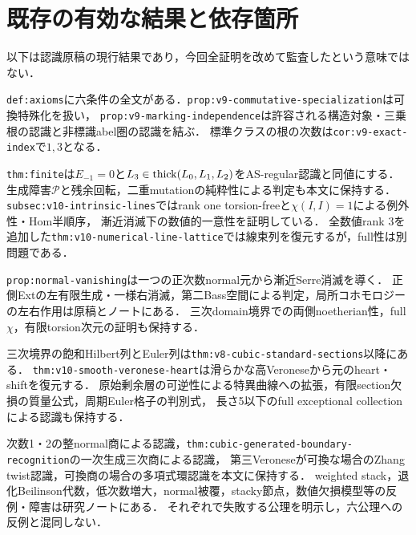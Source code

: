 \documentclass[11pt,a4paper]{ltjsarticle}
\begin{document}
\section{既存の有効な結果と依存箇所}
以下は認識原稿の現行結果であり，今回全証明を改めて監査したという意味ではない．
\begin{description}[style=nextline]
\item[六公理と標準クラス]
\texttt{def:axioms}に六条件の全文がある．\texttt{prop:v9-commutative-specialization}は可換特殊化を扱い，
\texttt{prop:v9-marking-independence}は許容される構造対象・三乗根の認識と非標識abel圏の認識を結ぶ．
標準クラスの根の次数は\texttt{cor:v9-exact-index}で$1,3$となる．
\item[有限障害と線束復元]
\texttt{thm:finite}は$E_{-1}=0$と$L_3\in\operatorname{thick}(L_0,L_1,L_2)$をAS-regular認識と同値にする．
生成障害$\mathcal P$と残余回転，二重mutationの純粋性による判定も本文に保持する．
\texttt{subsec:v10-intrinsic-lines}ではrank one torsion-freeと$\chi(I,I)=1$による例外性・Hom半順序，
漸近消滅下の数値的一意性を証明している．
全数値rank $3$を追加した\texttt{thm:v10-numerical-line-lattice}では線束列を復元するが，full性は別問題である．
\item[Extと有限性]
\texttt{prop:normal-vanishing}は一つの正次数normal元から漸近Serre消滅を導く．
正側Extの左有限生成・一様右消滅，第二Bass空間による判定，局所コホモロジーの左右作用は原稿とノートにある．
三次domain境界での両側noetherian性，full $\chi$，有限torsion次元の証明も保持する．
\item[境界の幾何と欠損]
三次境界の飽和Hilbert列とEuler列は\texttt{thm:v8-cubic-standard-sections}以降にある．
\texttt{thm:v10-smooth-veronese-heart}は滑らかな高Veroneseから元のheart・shiftを復元する．
原始剰余層の可逆性による特異曲線への拡張，有限section欠損の質量公式，周期Euler格子の判別式，
長さ5以下のfull exceptional collectionによる認識も保持する．
\item[各種認識と障害]
次数1・2の整normal商による認識，\texttt{thm:cubic-generated-boundary-recognition}の一次生成三次商による認識，
第三Veroneseが可換な場合のZhang twist認識，可換商の場合の多項式環認識を本文に保持する．
weighted stack，退化Beilinson代数，低次数増大，normal被覆，stacky節点，数値欠損模型等の反例・障害は研究ノートにある．
それぞれで失敗する公理を明示し，六公理への反例と混同しない．
\end{description}
\end{document}
